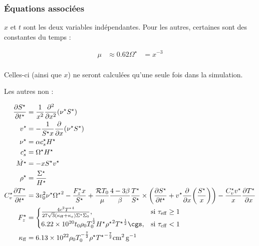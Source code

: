 \subsubsection{Équations associées}

$x$ et $t$ sont les deux variables indépendantes. Pour les autres, certaines sont des constantes du temps :

\begin{align}
    \mu &\approx 0.62
    \Omega^\star &= x^{-3} \\ 
\end{align}

Celles-ci (ainsi que $x$) ne seront calculées qu’une seule fois dans la simulation.

Les autres non :

\begin{align}
    \frac{\partial S^\star}{\partial t^\star} &= \frac{1}{x^2} \frac{\partial^2}{\partial x^2} \left(\nu^\star S^\star\right) \\
    v^\star &= - \frac{1}{S^\star x} \frac{\partial}{\partial x} \left(\nu^\star S^\star\right) \\
    \nu^\star &= \alpha c_s^\star H^\star \\
    c_s^\star &= \Omega^\star H^\star \\
    \dot{M^\star} &= - x S^\star v^\star \\
    \rho^\star &= \frac{\Sigma^\star}{H^\star} \\
    C_v^\star \frac{\partial T^{\star}}{\partial t^{\star}} &=
    3 v_0^2 \nu^\star {\Omega^\star}^2 - \frac{F_z^\star x}{S^\star} +
    \frac{\mathcal{R} T_0}{\mu} \frac{4-3\beta}{\beta} \frac{T^\star}{S^\star} \times
    \left( \frac{\partial S^\star}{\partial t^\star} + v^\star \frac{\partial}{\partial x} \left(\frac{S^\star}{x}\right) \right) -
    \frac{C_v^\star v^\star}{x} \frac{\partial T^\star}{\partial x} \\
    F_z^\star &=
    \begin{cases}
        \frac{4 c^2 {T^\star}^4}{27 \sqrt{3} (\kappa_\mathrm{ff} + \kappa_e)\Sigma^\star \Sigma_0}, &\text{si $\tau_\mathrm{eff} \geq 1$} \\
        \num{6.22e20} t_0 \rho_0 T_0^\frac{1}{2} H^\star {\rho^\star}^2 {T^\star}^\frac{1}{2} \si{\cgs}, &\text{si $\tau_\mathrm{eff} < 1$}
    \end{cases} \\
    \kappa_\mathrm{ff} &= \num{6.13e22} \rho_0 T_0^{-\frac{7}{2}} \rho^\star {T^\star}^{-\frac{7}{2}} \si{\square\centi\meter\per\gram} \\

\end{align}
